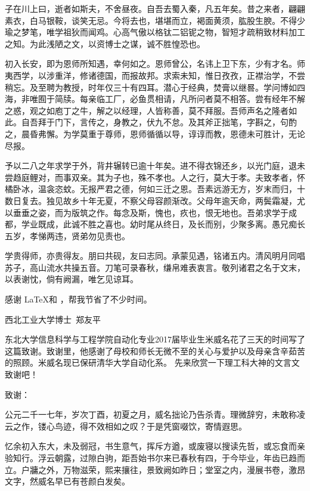 \begin{acknowledgement}

子在川上曰，逝者如斯夫，不舍昼夜。自吾去蜀入秦，凡五年矣。昔之来者，翩翩素衣，白马银鞍，谈笑无忌。今将去也，堪堪而立，褐面黄须，肱股生腴。不得少瑜之梦笔，唯学祖狄而闻鸡。心高气傲以格钛二铝铌之物，智短才疏稍致材料加工之知。为此浅陋之文，以资博士之谋，诚不胜惶恐也。

初入长安，即为恩师所知遇，幸何如之。恩师曾公，名讳上卫下东，少有才名。师夷西学，以涉重洋，修诸德国，而报故邦。求索未知，惟日孜孜，正襟治学，不尝稍忘。及至聘为教授，时年仅三十有四耳。潜心于经典，焚膏以继晷。学问博如四海，非唯囿于简牍。每亲临工厂，必鱼贯相请，凡所问者莫不相答。尝有经年不解之惑，观之如庖丁之牛，解之以经理，人皆称善，莫不拜服。吾师声名之隆者如此。自吾拜于门下，言传之，身教之，伏九不怠。及其斧正拙笔，字斟之，句酌之，晨昏弗懈。为学莫重于尊师，恩师循循以导，谆谆而教，恩德未可胜计，无论尽报。

予以二八之年求学于外，背井辗转已逾十年矣。进不得衣锦还乡，以光门庭，退未尝趋庭鲤对，而事双亲。其为子也，殊不孝也。人之行，莫大于孝。夫致孝者，怀橘卧冰，温衾恣蚊。无报严君之德，何如三迁之恩。吾素远游无方，岁末而归，十数日复去。独见故乡十年无夏，不察父母容颜渐改。父母年逾天命，两鬓霜凝，尤以垂垂之姿，而为版筑之作。每念及斯，愧也，疚也，恨无地也。吾弟求学于成都，学业既成，此诚不胜之喜也。幼时尾从终日，及长而别，少聚多离。愚兄痴长五岁，孝悌两违，贤弟勿见责也。

学贵得师，亦贵得友。朋曰共砚，友曰志同。承蒙见遇，铭诸五内。清风明月同唱苏子，高山流水共操五音。刀笔可录春秋，缣帛难表衷言。敬列诸君之名于文末，以表谢忱，倘有阙漏，唯乞见谅耳。

  感谢 \LaTeX 和 \nwafuthesis，帮我节省了不少时间。

西北工业大学博士\  郑友平

\newpage


东北大学信息科学与工程学院自动化专业2017届毕业生米威名花了三天的时间写了这篇致谢。致谢里，他感谢了母校和师长无微不至的关心与爱护以及母亲含辛茹苦的照顾。米威名现已保研清华大学自动化系。
先来欣赏一下理工科大神的文言文致谢吧！

致谢：

公元二千一七年，岁次丁酉，初夏之月，威名拙论乃告杀青。理微辞穷，未敢称凌云之作，镂心鸟迹，得不效相如之叹？于是凭窗啜饮，寄情遐思。

忆余初入东大，未及弱冠，书生意气，挥斥方遒，或废寝以搜读先哲，或忘食而亲验知行。浮云朝露，过隙白驹，距吾始书尔来已春秋有四，于今毕业，年齿已趋而立。户牅之外，万物滋荣，熙来攘往，景致阙如昨日；堂室之内，漫展书卷，激昂文字，然威名早已有苍颜白发矣。


\end{acknowledgement}
